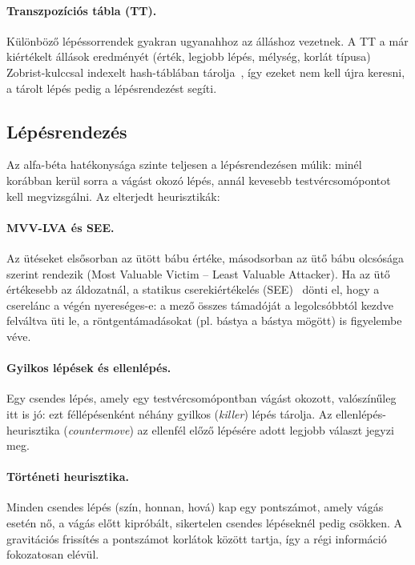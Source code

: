 \paragraph{Transzpozíciós tábla (TT).} Különböző lépéssorrendek gyakran ugyanahhoz az álláshoz vezetnek. A TT a már kiértékelt állások eredményét (érték, legjobb lépés, mélység, korlát típusa) Zobrist-kulccsal indexelt hash-táblában tárolja~\cite{CPWTT}, így ezeket nem kell újra keresni, a tárolt lépés pedig a lépésrendezést segíti.

\subsection{Lépésrendezés}

Az alfa-béta hatékonysága szinte teljesen a lépésrendezésen múlik: minél korábban kerül sorra a vágást okozó lépés, annál kevesebb testvércsomópontot kell megvizsgálni. Az elterjedt heurisztikák:

\paragraph{MVV-LVA és SEE.} Az ütéseket elsősorban az ütött bábu értéke, másodsorban az ütő bábu olcsósága szerint rendezik (Most Valuable Victim -- Least Valuable Attacker). Ha az ütő értékesebb az áldozatnál, a statikus cserekiértékelés (SEE)~\cite{CPWSEE} dönti el, hogy a cserelánc a végén nyereséges-e: a mező összes támadóját a legolcsóbbtól kezdve felváltva üti le, a röntgentámadásokat (pl. bástya a bástya mögött) is figyelembe véve.

\paragraph{Gyilkos lépések és ellenlépés.} Egy csendes lépés, amely egy testvércsomópontban vágást okozott, valószínűleg itt is jó: ezt féllépésenként néhány gyilkos (\emph{killer}) lépés tárolja. Az ellenlépés-heurisztika (\emph{countermove}) az ellenfél előző lépésére adott legjobb választ jegyzi meg.

\paragraph{Történeti heurisztika.} Minden csendes lépés (szín, honnan, hová) kap egy pontszámot, amely vágás esetén nő, a vágás előtt kipróbált, sikertelen csendes lépéseknél pedig csökken. A gravitációs frissítés a pontszámot korlátok között tartja, így a régi információ fokozatosan elévül.

